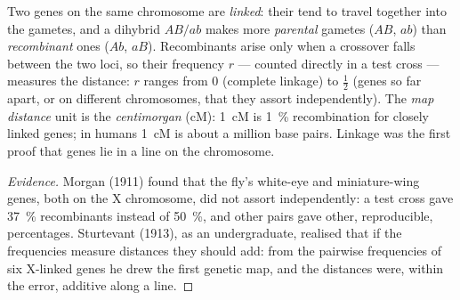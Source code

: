 \begin{definition}\label{def:b2:meiosis-heredity:linkage}
Two genes on the same chromosome are \emph{linked}: their 
tend to travel together into the gametes, and a dihybrid
$AB/ab$ makes more \emph{parental} gametes ($AB$, $ab$) than
\emph{recombinant} ones ($Ab$, $aB$). Recombinants arise only when a
crossover falls between the two loci, so their frequency $r$ ---
counted directly in a test cross --- measures the distance: $r$
ranges from 0 (complete linkage) to $\tfrac12$ (genes so far apart,
or on different chromosomes, that they assort independently). The
\emph{map distance} unit is the \emph{centimorgan} (cM): \qty{1}{cM}
is \qty{1}{\%} recombination for closely linked genes; in humans
\qty{1}{cM} is about a million base pairs. Linkage was the first
proof that genes lie in a line on the chromosome.
\end{definition}
\begin{proof}[Evidence]
Morgan (1911) found that the fly's white-eye and miniature-wing
genes, both on the X chromosome, did not assort independently: a
test cross gave \qty{37}{\%} recombinants instead of \qty{50}{\%},
and other pairs gave other, reproducible, percentages. Sturtevant
(1913), as an undergraduate, realised that if the frequencies
measure distances they should add: from the pairwise
frequencies of six X-linked genes he drew the first genetic map, and
the distances were, within the error, additive along a line.
\end{proof}

